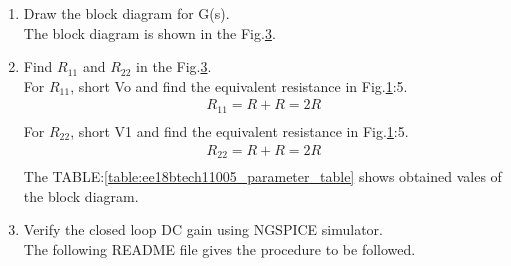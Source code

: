 \begin{enumerate}[label=\arabic*.,ref=\theenumi]
\begin{figure}[!ht]
	\begin{center}
			\resizebox{\columnwidth}{!}{}
	\end{center}
\caption{4}
\label{fig:H_circuit}
\end{figure}
This feedback is given across G2,G3,G4.
The equivalent block diagram is shown in the Fig.\ref{fig:ee18btech11005_4}:5.
\begin{figure}[!ht]
	\begin{center}
			\resizebox{\columnwidth}{!}{}
	\end{center}
\caption{5}
\label{fig:ee18btech11005_4}
\end{figure}
\item Draw the block diagram for G(s).\\
\solution The block diagram is shown in the Fig.\ref{fig:G_blockdiagram}.
\begin{figure}[!ht]
	\begin{center}
	    \resizebox{\columnwidth}{!}{}
	\end{center}
\caption{}
\label{fig:G_blockdiagram}
\end{figure}
\item Find $R_{11}$ and $R_{22}$ in the Fig.\ref{fig:G_blockdiagram}.\\
\solution For $R_{11}$, short Vo and find the equivalent resistance in Fig.\ref{fig:H_circuit}:5.
\begin{align}
    R_{11} = R+R = 2R\\
\end{align}
For $R_{22}$, short V1 and find the equivalent resistance in Fig.\ref{fig:H_circuit}:5.
\begin{align}
    R_{22} = R+R = 2R\\
\end{align}
The TABLE:\ref{table:ee18btech11005_parameter_table} shows obtained vales of the block diagram.
\begin{table}[!ht]
\centering

\caption{}
\label{table:ee18btech11005_parameter_table}
\end{table}
\item Verify the closed loop DC gain using NGSPICE simulator.
\\
\solution 
The following README file gives the procedure to be followed.

\end{enumerate}
